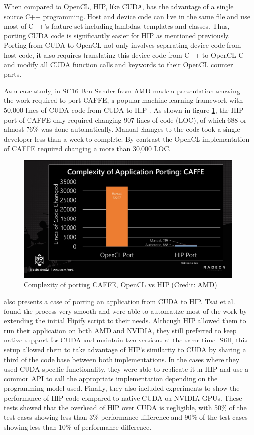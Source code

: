 When compared to OpenCL, HIP, like CUDA, has the advantage of a single source C++ programming. Host and device code can live in the same file and use most of C++'s feature set including lambdas, templates and classes. Thus, porting CUDA code is significantly easier for HIP as mentioned previously. Porting from CUDA to OpenCL not only involves separating device code from host code, it also requires translating this device code from C++ to OpenCL C and modify all CUDA function calls and keywords to their OpenCL counter parts.

As a case study, in SC16 Ben Sander from AMD made a presentation showing the work required to port CAFFE, a popular machine learning framework with 50,000 lines of CUDA code from CUDA to HIP \cite{caffe_rocm_port}. As shown in figure \ref{fig:caffe-rocm-port}, the HIP port of CAFFE only required changing 907 lines of code (LOC), of which 688 or almost 76\% was done automatically. Manual changes to the code took a single developer less than a week to complete. By contrast the OpenCL implementation of CAFFE required changing a more than 30,000 LOC.

\begin{figure}[ht]
    \centering
    \includegraphics[width=\textwidth]{img/caffe-rocm-port.png}
    \captionsetup{justification=centering}
    \caption{Complexity of porting CAFFE, OpenCL vs HIP (Credit: AMD)}
    \label{fig:caffe-rocm-port}
\end{figure}

\cite{ginkgo_rocm_port} also presents a case of porting an application from CUDA to HIP. Tsai et al. found the process very smooth and were able to automatize most of the work by extending the initial Hipify script to their needs. Although HIP allowed them to run their application on both AMD and NVIDIA, they still preferred to keep native support for CUDA and maintain two versions at the same time. Still, this setup allowed them to take advantage of HIP's similarity to CUDA by sharing a third of the code base between both implementations. In the cases where they used CUDA specific functionality, they were able to replicate it in HIP and use a common API to call the appropriate implementation depending on the programming model used. Finally, they also included experiments to show the performance of HIP code compared to native CUDA on NVIDIA GPUs. These tests showed that the overhead of HIP over CUDA is negligible, with 50\% of the test cases showing less than 3\% performance difference and 90\% of the test cases showing less than 10\% of performance difference.

